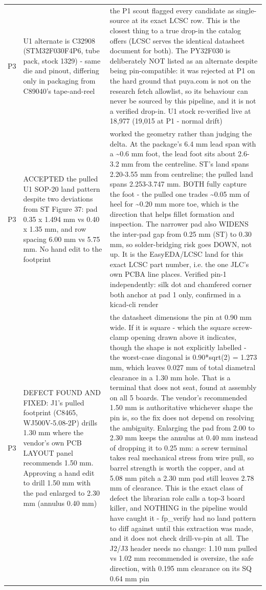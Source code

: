 \documentclass[11pt,a4paper]{article}
\begin{document}
{\begin{longtable}{lp{5.2cm}p{7.2cm}}
P3 & U1 alternate is C32908 (STM32F030F4P6, tube pack, stock 1329) - same die and pinout, differing only in packaging from C89040's tape-and-reel & the P1 scout flagged every candidate as single-source at its exact LCSC row. This is the closest thing to a true drop-in the catalog offers (LCSC serves the identical datasheet document for both). The PY32F030 is deliberately NOT listed as an alternate despite being pin-compatible: it was rejected at P1 on the hard ground that puya.com is not on the research fetch allowlist, so its behaviour can never be sourced by this pipeline, and it is not a verified drop-in. U1 stock re-verified live at 18,977 (19,015 at P1 - normal drift) \\
P3 & ACCEPTED the pulled U1 SOP-20 land pattern despite two deviations from ST Figure 37: pad 0.35 x 1.494 mm vs 0.40 x 1.35 mm, and row spacing 6.00 mm vs 5.75 mm. No hand edit to the footprint & worked the geometry rather than judging the delta. At the package's 6.4 mm lead span with a \textasciitilde{}0.6 mm foot, the lead foot sits about 2.6-3.2 mm from the centreline. ST's land spans 2.20-3.55 mm from centreline; the pulled land spans 2.253-3.747 mm. BOTH fully capture the foot - the pulled one trades \textasciitilde{}0.05 mm of heel for \textasciitilde{}0.20 mm more toe, which is the direction that helps fillet formation and inspection. The narrower pad also WIDENS the inter-pad gap from 0.25 mm (ST) to 0.30 mm, so solder-bridging risk goes DOWN, not up. It is the EasyEDA/LCSC land for this exact LCSC part number, i.e. the one JLC's own PCBA line places. Verified pin-1 independently: silk dot and chamfered corner both anchor at pad 1 only, confirmed in a kicad-cli render \\
P3 & DEFECT FOUND AND FIXED: J1's pulled footprint (C8465, WJ500V-5.08-2P) drills 1.30 mm where the vendor's own PCB LAYOUT panel recommends 1.50 mm. Approving a hand edit to drill 1.50 mm with the pad enlarged to 2.30 mm (annulus 0.40 mm) & the datasheet dimensions the pin at 0.90 mm wide. If it is square - which the square screw-clamp opening drawn above it indicates, though the shape is not explicitly labelled - the worst-case diagonal is 0.90{*}sqrt(2) = 1.273 mm, which leaves 0.027 mm of total diametral clearance in a 1.30 mm hole. That is a terminal that does not seat, found at assembly on all 5 boards. The vendor's recommended 1.50 mm is authoritative whichever shape the pin is, so the fix does not depend on resolving the ambiguity. Enlarging the pad from 2.00 to 2.30 mm keeps the annulus at 0.40 mm instead of dropping it to 0.25 mm: a screw terminal takes real mechanical stress from wire pull, so barrel strength is worth the copper, and at 5.08 mm pitch a 2.30 mm pad still leaves 2.78 mm of clearance. This is the exact class of defect the librarian role calls a top-3 board killer, and NOTHING in the pipeline would have caught it - fp\_verify had no land pattern to diff against until this extraction was made, and it does not check drill-vs-pin at all. The J2/J3 header needs no change: 1.10 mm pulled vs 1.02 mm recommended is oversize, the safe direction, with 0.195 mm clearance on its SQ 0.64 mm pin \\

\end{longtable}}
\end{document}
